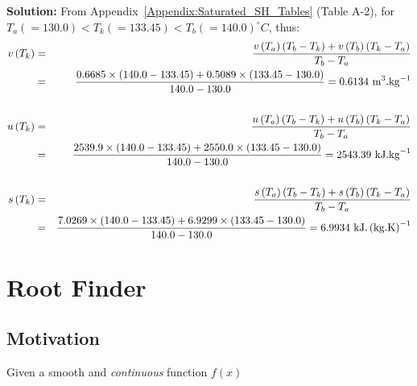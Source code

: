\begin{list}{\bf Example :~}{}
           {\bf Solution:} From Appendix~\ref{Appendix:Saturated_SH_Tables} (Table A-2), for $T_{a}(=130.0) < T_{k} (= 133.45) < T_{b} (=140.0)^{\circ}C$, thus:
               \begin{eqnarray}
                  v\left(T_{k}\right) &=& \displaystyle\frac{v\left(T_{a}\right)\left(T_{b}-T_{k}\right) + v\left(T_{b}\right)\left(T_{k}-T_{a}\right)}{T_{b}-T_{a}} \nonumber \\
                                     &=& \displaystyle\frac{0.6685\times(140.0-133.45) + 0.5089\times(133.45-130.0)}{140.0-130.0} = 0.6134 \text{ m}^{3}\text{.kg}^{-1}\nonumber \\
                                     && \nonumber \\
                  u\left(T_{k}\right) &=& \displaystyle\frac{u\left(T_{a}\right)\left(T_{b}-T_{k}\right) + u\left(T_{b}\right)\left(T_{k}-T_{a}\right)}{T_{b}-T_{a}} \nonumber \\
                                     &=& \displaystyle\frac{2539.9\times(140.0-133.45) + 2550.0\times(133.45-130.0)}{140.0-130.0} = 2543.39 \text{ kJ.kg}^{-1}\nonumber \\
                                     && \nonumber \\
                  s\left(T_{k}\right) &=& \displaystyle\frac{s\left(T_{a}\right)\left(T_{b}-T_{k}\right) + s\left(T_{b}\right)\left(T_{k}-T_{a}\right)}{T_{b}-T_{a}} \nonumber \\
                                     &=& \displaystyle\frac{7.0269\times(140.0-133.45) + 6.9299\times(133.45-130.0)}{140.0-130.0} = 6.9934 \text{ kJ.}\left(\text{kg.K}\right)^{-1}\nonumber 
               \end{eqnarray}


    \end{list}

\section{Root Finder}

\subsection{Motivation}
Given a smooth and {\it continuous} function $f(x)$
